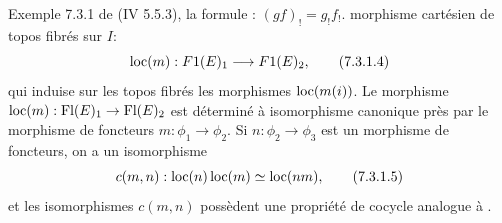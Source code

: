\documentclass[10pt]{../fichiers-configuration-latex/smfart}
\begin{document}
\begin{enonce*}[remark]{Exemple 7.3.1}
{  de (IV 5.5.3), la formule : $(gf)_! = g_! f_!$.} morphisme cartésien
de topos fibrés sur $I$:
\begin{equation*}
\loc(m) : F1(E)_1 \to F1 (E)_2{\quoi},\tag{7.3.1.4}
\end{equation*}
qui induise sur les topos fibrés les morphismes $\operatorname{loc}(m(i))$.  Le
morphisme $\loc(m) : \text{Fl}(E)_1 \to \text{Fl} (E)_2$ est déterminé à
isomorphisme canonique près par le morphisme de foncteurs $m : \phi_1
\to \phi_2$. Si $n : \phi_2 \to \phi_3$ est un morphisme de foncteurs,
on a un isomorphisme
\begin{equation*}
c(m, n) : \operatorname{loc} (n) \operatorname{loc}(m) \simeq \operatorname{loc}(nm){},\tag{7.3.1.5}
\end{equation*}
et les isomorphismes $c(m, n)$ possèdent une propriété de cocycle
analogue à .
\end{enonce*}
\end{document}
